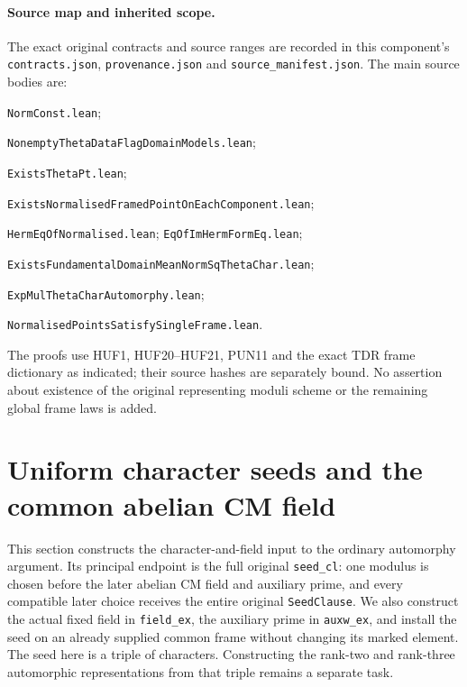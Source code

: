 \documentclass[11pt,a4paper]{article}
\numberwithin{equation}{section}
\theoremstyle{remark}\newtheorem{remark}[theorem]{Remark}
\begin{document}
\paragraph{Source map and inherited scope.}
The exact original contracts and source ranges are recorded in
this component's \texttt{contracts.\allowbreak json}, \texttt{provenance.\allowbreak json}
and \texttt{source\_\allowbreak manifest.\allowbreak json}.
The main source bodies are:\par
\noindent\texttt{Norm\allowbreak Const.\allowbreak lean};\par
\noindent\texttt{Nonempty\allowbreak Theta\allowbreak Data\allowbreak Flag\allowbreak Domain\allowbreak Models.\allowbreak lean};\par
\noindent\texttt{Exists\allowbreak Theta\allowbreak Pt.\allowbreak lean};\par
\noindent\texttt{Exists\allowbreak Normalised\allowbreak Framed\allowbreak Point\allowbreak On\allowbreak Each\allowbreak Component.\allowbreak lean};\par
\noindent\texttt{Herm\allowbreak Eq\allowbreak Of\allowbreak Normalised.\allowbreak lean};
\texttt{Eq\allowbreak Of\allowbreak Im\allowbreak Herm\allowbreak Form\allowbreak Eq.\allowbreak lean};\par
\noindent\texttt{Exists\allowbreak Fundamental\allowbreak Domain\allowbreak Mean\allowbreak Norm\allowbreak Sq\allowbreak Theta\allowbreak Char.\allowbreak lean};\par
\noindent\texttt{Exp\allowbreak Mul\allowbreak Theta\allowbreak Char\allowbreak Automorphy.\allowbreak lean};\par
\noindent\texttt{Normalised\allowbreak Points\allowbreak Satisfy\allowbreak Single\allowbreak Frame.\allowbreak lean}.\par
The proofs use HUF1, HUF20--HUF21, PUN11 and the exact TDR
frame dictionary as indicated; their source hashes are separately
bound.  No assertion about existence of the original representing
moduli scheme or the remaining global frame laws is added.


\section{Uniform character seeds and the common abelian CM field}
\label{sec:common-arithmetic-frame-v50}

This section constructs the character-and-field input to the ordinary
automorphy argument.  Its principal endpoint is the full original
\texttt{seed\_\allowbreak cl}: one modulus is chosen before the later abelian CM
field and auxiliary prime, and every compatible later choice receives
the entire original \texttt{Seed\allowbreak Clause}.  We also construct the actual
fixed field in \texttt{field\_\allowbreak ex}, the auxiliary prime in
\texttt{auxw\_\allowbreak ex}, and install the seed on an already supplied common
frame without changing its marked element.  The seed here is a triple
of characters.  Constructing the rank-two and rank-three automorphic
representations from that triple remains a separate task.
\end{document}
